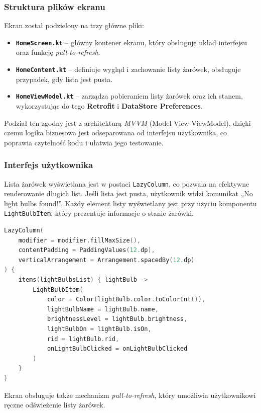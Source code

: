 \documentclass[12pt]{article}
\begin{document}
\subsubsection*{Struktura plików ekranu}
\noindent Ekran został podzielony na trzy główne pliki:
\begin{itemize}
    \item \textbf{\texttt{HomeScreen.kt}} – główny kontener ekranu, który obsługuje układ interfejsu oraz funkcję \textit{pull-to-refresh}.
    \item \textbf{\texttt{HomeContent.kt}} – definiuje wygląd i zachowanie listy żarówek, obsługuje przypadek, gdy lista jest pusta.
    \item \textbf{\texttt{HomeViewModel.kt}} – zarządza pobieraniem listy żarówek oraz ich stanem, wykorzystując do tego \textbf{Retrofit} i \textbf{DataStore Preferences}.
\end{itemize}

\noindent Podział ten zgodny jest z architekturą \textit{MVVM} (Model-View-ViewModel), dzięki czemu logika biznesowa jest odseparowana od interfejsu użytkownika, co poprawia czytelność kodu
i ułatwia jego testowanie.

\subsubsection*{Interfejs użytkownika}
\noindent Lista żarówek wyświetlana jest w postaci \texttt{LazyColumn}, co pozwala na efektywne renderowanie długich list. Jeśli lista jest pusta, użytkownik widzi komunikat „No light bulbs found!”.
Każdy element listy wyświetlany jest przy użyciu komponentu \texttt{LightBulbItem}, który prezentuje informacje o stanie żarówki.

\begin{lstlisting}[language=Kotlin]
LazyColumn(
    modifier = modifier.fillMaxSize(),
    contentPadding = PaddingValues(12.dp),
    verticalArrangement = Arrangement.spacedBy(12.dp)
) {
    items(lightBulbsList) { lightBulb ->
        LightBulbItem(
            color = Color(lightBulb.color.toColorInt()),
            lightBulbName = lightBulb.name,
            brightnessLevel = lightBulb.brightness,
            lightBulbOn = lightBulb.isOn,
            rid = lightBulb.rid,
            onLightBulbClicked = onLightBulbClicked
        )
    }
}
\end{lstlisting}

\noindent Ekran obsługuje także mechanizm \textit{pull-to-refresh}, który umożliwia użytkownikowi ręczne odświeżenie listy żarówek.
\end{document}
